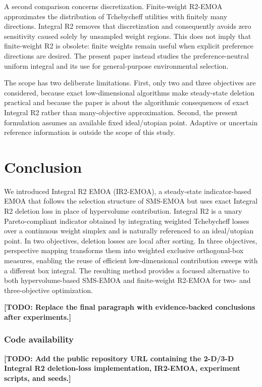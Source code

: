 \documentclass[runningheads]{llncs}
\newcommand{\todo}[1]{\textcolor{red!70!black}{\textbf{[TODO: #1]}}}
\begin{document}
A second comparison concerns discretization. Finite-weight R2-EMOA approximates the distribution of Tchebycheff utilities with finitely many directions. Integral R2 removes that discretization and consequently avoids zero sensitivity caused solely by unsampled weight regions. This does not imply that finite-weight R2 is obsolete: finite weights remain useful when explicit preference directions are desired. The present paper instead studies the preference-neutral uniform integral and its use for general-purpose environmental selection.

The scope has two deliberate limitations. First, only two and three objectives are considered, because exact low-dimensional algorithms make steady-state deletion practical and because the paper is about the algorithmic consequences of exact Integral R2 rather than many-objective approximation. Second, the present formulation assumes an available fixed ideal/utopian point. Adaptive or uncertain reference information is outside the scope of this study.

\section{Conclusion}
\label{sec:conclusion}

We introduced Integral R2 EMOA (IR2-EMOA), a steady-state indicator-based EMOA that follows the selection structure of SMS-EMOA but uses exact Integral R2 deletion loss in place of hypervolume contribution. Integral R2 is a unary Pareto-compliant indicator obtained by integrating weighted Tchebycheff losses over a continuous weight simplex and is naturally referenced to an ideal/utopian point. In two objectives, deletion losses are local after sorting. In three objectives, perspective mapping transforms them into weighted exclusive orthogonal-box measures, enabling the reuse of efficient low-dimensional contribution sweeps with a different box integral. The resulting method provides a focused alternative to both hypervolume-based SMS-EMOA and finite-weight R2-EMOA for two- and three-objective optimization.

\todo{Replace the final paragraph with evidence-backed conclusions after experiments.}

\subsubsection*{Code availability}
\todo{Add the public repository URL containing the 2-D/3-D Integral R2 deletion-loss implementation, IR2-EMOA, experiment scripts, and seeds.}
\end{document}
